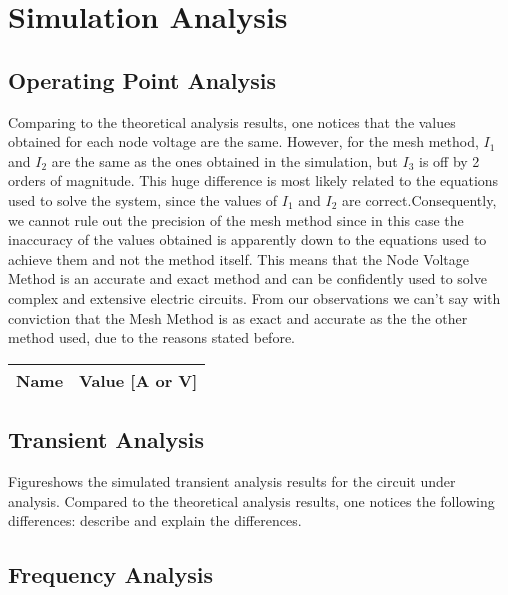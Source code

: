 \section{Simulation Analysis}
\label{sec:simulation}

\subsection{Operating Point Analysis}

\par Comparing to the theoretical analysis results, one notices that the values obtained for each node voltage are the same. However, for the mesh method, $I_1$ and $I_2$ are the same as the ones obtained in the simulation, but $I_3$ is off by 2 orders of magnitude. This huge difference is most likely related to the equations used to solve the system, since the values of $I_1$ and $I_2$ are correct.Consequently, we cannot rule out the precision of the mesh method since in this case the inaccuracy of the values obtained is apparently down to the equations used to achieve them and not the method itself. This means that the Node Voltage Method is an accurate and exact method and can be confidently used to solve complex and extensive electric circuits. From our observations we can't say with conviction that the Mesh Method is as exact and accurate as the the other method used, due to the reasons stated before. 

\begin{table}[h]
  \centering
  \begin{tabular}{|l|r|}
    \hline    
    {\bf Name} & {\bf Value [A or V]} \\ \hline
    
  \end{tabular}
  \label{tab:op}
\end{table}



\subsection{Transient Analysis}

Figureshows the simulated transient analysis results for the
circuit under analysis. Compared to the theoretical analysis results, one
notices the following differences: describe and explain the differences.



\subsection{Frequency Analysis}

